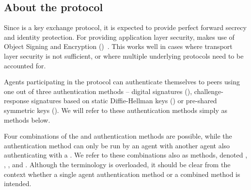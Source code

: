 

\subsection{About the protocol}




Since \mEdhoc is a key exchange protocol, it is expected to provide perfect forward secrecy and identity protection. For providing application layer security, \mEdhoc makes use of \mCbor Object Signing and Encryption (\mCose)~\cite{rfc8152}. This works well in cases where transport layer security is not sufficient, or where multiple underlying protocols need to be accounted for. 

Agents participating in the \mEdhoc{} protocol can authenticate themselves to
peers using one out of three authentication methods -- digital signatures
(\mSig), challenge-response signatures based on static Diffie-Hellman keys
(\mStat) or pre-shared symmetric keys (\mPsk).
We will refer to these authentication methods simply as methods below.

Four combinations of the \mSig{} and \mStat{} authentication methods are possible,
while the \mPsk{} authentication method can only be run by an agent with another
agent also authenticating with a \mPsk.
We refer to these combinations also as methods, denoted \mSigSig, \mSigStat,
\mStatStat, \mStatSig{} and \mPskPsk.
Although the terminology is overloaded, it should be clear from the context
whether a single agent authentication method or a combined method is intended.

